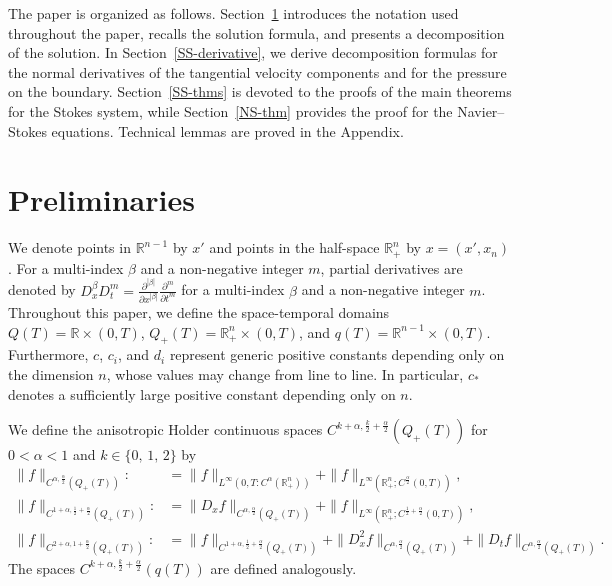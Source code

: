 \documentclass{amsart}
\numberwithin{equation}{section}
\newcommand{\R}{{ \mathbb R}^n}
\newcommand {\al}{\alpha}
\newcommand {\be}{\beta}
\begin{document}
The paper is organized as follows.
Section~\ref{SS-half} introduces the notation used throughout the paper, recalls
the solution formula, and presents a decomposition of the solution.
In Section~\ref{SS-derivative}, we derive decomposition formulas for the normal
derivatives of the tangential velocity components and for the pressure on the
boundary.
Section~\ref{SS-thms} is devoted to the proofs of the main theorems for the
Stokes system, while Section~\ref{NS-thm} provides the proof for the
Navier--Stokes equations. Technical lemmas are proved in the Appendix.


\section{Preliminaries }\label{SS-half}
\setcounter{equation}{0}
We denote points in $\mathbb{R}^{n-1}$ by $x'$ and points in the half-space $\mathbb{R}^n_+$ by $x = (x', x_n)$. For a multi-index $\beta$ and a non-negative integer $m$, partial derivatives are denoted by
$\displaystyle D^\be_x D^m_t = \frac{\partial^{|\be|}}{\partial x^{|\be|}} \frac{\partial^m}{\partial t^m}$ 
for a multi-index $\be$ and a non-negative integer $m$. 
Throughout this paper, we define the space-temporal domains  $Q(T) = \mathbb{R} \times (0, T)$, $Q_+(T) = \mathbb{R}^n_+ \times (0, T)$, and $q(T) = \mathbb{R}^{n-1} \times (0, T)$. Furthermore, $c$, $c_i$, and $d_i$ represent generic positive constants depending only on the dimension $n$, whose values may change from line to line.  In particular, $c_*$ denotes a sufficiently large positive constant depending only on $n$.




We define the anisotropic  Holder continuous  spaces  $C^{ k + \al,  \frac{k}2 + \frac{\al}2} ( Q_+(T) )$ for $0 <\al <1$ and $ k \in \{0, \,  1, \, 2 \}$  by
\begin{align*}
\| f \|_{ C^{\al, \frac{\al}2} ( Q_+(T) )} :  &  = \| f \|_{L^\infty(0, T: C^\al (\R_+))  } + \| f \|_{ L^\infty (\R_+; C^{\frac{\al}2} (0, T)) },\\
\| f \|_{ C^{ 1 + \al,  \frac12 + \frac{\al}2} ( Q_+(T) )} :  &  = \|D_x  f \|_{C^{\al, \frac{\al}2} ( Q_+(T) )} + \| f \|_{ L^\infty (\R_+; C^{\frac12 + \frac{\al}2} (0, T))},\\
\| f \|_{ C^{ 2 + \al,  1+ \frac{\al}2} ( Q_+(T) )} :  &  =  \|   f \|_{C^{1 + \al,  \frac12 + \frac{\al}2} ( Q_+(T) )}  + \|D^2_x  f \|_{C^{\al, \frac{\al}2} ( Q_+(T) ) } + \| D_t f\|_{C^{\al, \frac{\al}2} ( Q_+(T) )}.
\end{align*}
The spaces  $C^{ k + \al,  \frac{k}2 + \frac{\al}2} ( q(T) )$ 
 are defined analogously.
\end{document}
